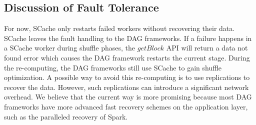 

{\color{blue}
\subsection{Discussion of Fault Tolerance}\label{fault}
For now, SCache only restarts failed workers without recovering their data.
SCache leaves the fault handling to the DAG frameworks.
If a failure happens in a SCache worker during shuffle phases, the $getBlock$ API will return a data not found error which causes the DAG framework restarts the current stage.
During the re-computing, the DAG frameworks still use SCache to gain shuffle optimization.
A possible way to avoid this re-computing is to use replications to recover the data.
However, such replications can introduce a significant network overhead.
We believe that the current way is more promising because most DAG frameworks have more advanced fast recovery schemes on the application layer, such as the paralleled recovery of Spark. 
}

